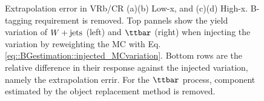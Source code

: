 \begin{figure}[h]
  \centering

 \caption{Extrapolation error in VRb/CR (a)(b) Low-x, and (c)(d) High-x. B-tagging requirement is removed. Top pannels show the yield variation of $W+\mathrm{jets}$ (left) and $\ttbar$ (right) when injecting the variation by reweighting the MC with Eq. \ref{eq::BGestimation::injected_MCvariation}. Bottom rows are the relative difference in their response against the injected variation, namely the extrapolation errir. For the $\ttbar$ process, component estimated by the object replacement method is removed.  \label{fig::BGestimation::valid_extp_VRb6J} }
\end{figure}


